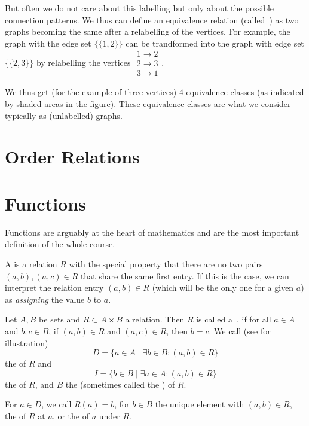 But often we do not care about this labelling but only  about the possible
connection patterns. We thus can define an equivalence relation
(called~) as two graphs becoming the same after a
relabelling of the vertices. For example, the graph with the edge set
$\{\{1,2\}\}$ can be trandformed into the graph with edge set $\{\{2,3\}\}$ by
relabelling
the vertices $\begin{array}{c}1\to 2\\2\to3\\3\to1\end{array}$.

We thus get (for the example of three vertices) $4$ equivalence classes
(as indicated by shaded areas in the figure). These equivalence classes are
what we consider typically as (unlabelled) graphs. 

\section{Order Relations}

\section{Functions}

Functions are arguably at the heart of mathematics and are the most
important definition of the whole course.

A  is a relation $R$ with the special property that there
are no two pairs $(a,b),(a,c)\in R$ that share the same first entry.  If
this is the case, we can interpret the relation entry $(a,b)\in R$ (which
will be the only one for a given $a$) as {\em assigning} the value $b$ to
$a$.

\begin{defn}
Let $A,B$ be sets and $R\subset A\times B$ a relation. Then $R$ is called
a~, if for all $a\in A$ and $b,c\in B$, if $(a,b)\in R$ and
$(a,c)\in R$, then $b=c$.
We call  (see  for illustration)
\[
D=\{a\in A\mid \exists b\in B: (a,b)\in R\}
\]
the  of $R$ and
\[
I=\{b\in B\mid \exists a\in A: (a,b)\in R\}
\]
the  of $R$, and $B$ the  (sometimes called
the ) of $R$.

For $a\in D$, we call $R(a)=b$, for $b\in B$
the unique element with $(a,b)\in R$, the  of $R$ at $a$, or
the  of $a$ under $R$.
\end{defn}


